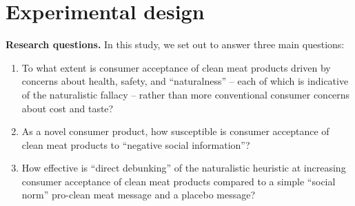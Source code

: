 \documentclass[12pt]{article}
\newcommand{\todo}[1]{\textit{\textcolor{red}{$<$todo$>$ #1 $<$/todo$>$}}}
\begin{document}












\section{Experimental design}
\label{sec:design}

\textbf{Research questions.} In this study, we set out to answer three main questions:

\begin{enumerate}
    \item To what extent is consumer acceptance of clean meat products driven by concerns about health, safety, and ``naturalness'' -- each of which is indicative of the naturalistic fallacy -- rather than more conventional consumer concerns about cost and taste?
    \item As a novel consumer product, how susceptible is consumer acceptance of clean meat products to ``negative social information''?
    \item How effective is ``direct debunking'' of the naturalistic heuristic at increasing consumer acceptance of clean meat products compared to a simple ``social norm'' pro-clean meat message and a placebo message?
\end{enumerate}
\end{document}
